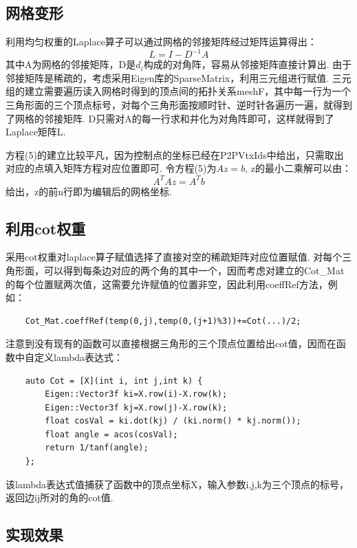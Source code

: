 \documentclass[12pt]{article}
\begin{document}
\subsection{网格变形}
利用均匀权重的Laplace算子可以通过网格的邻接矩阵经过矩阵运算得出：
\begin{equation}
    L=I-D^{-1}A
\end{equation}
其中A为网格的邻接矩阵，D是$d_i$构成的对角阵，容易从邻接矩阵直接计算出. 由于邻接矩阵是稀疏的，考虑采用Eigen库的SparseMatrix，利用三元组进行赋值. 
三元组的建立需要遍历读入网格时得到的顶点间的拓扑关系meshF，其中每一行为一个三角形面的三个顶点标号，对每个三角形面按顺时针、逆时针各遍历一遍，就得到了网格的邻接矩阵. 
D只需对A的每一行求和并化为对角阵即可，这样就得到了Laplace矩阵L.

方程(5)的建立比较平凡，因为控制点的坐标已经在P2PVtxIds中给出，只需取出对应的点填入矩阵方程对应位置即可. 令方程(5)为$Az=b$, z的最小二乘解可以由：
\begin{equation}
    A^T Az=A^T b
\end{equation}
给出，z的前n行即为编辑后的网格坐标. 

\subsection{利用cot权重}
采用cot权重对laplace算子赋值选择了直接对空的稀疏矩阵对应位置赋值. 对每个三角形面，可以得到每条边对应的两个角的其中一个，因而考虑对建立的Cot\_Mat的每个位置赋两次值，这需要允许赋值的位置非空，因此利用coeffRef方法，例如：
\begin{lstlisting}
    Cot_Mat.coeffRef(temp(0,j),temp(0,(j+1)%3))+=Cot(...)/2;
\end{lstlisting}

注意到没有现有的函数可以直接根据三角形的三个顶点位置给出cot值，因而在函数中自定义lambda表达式：
\begin{lstlisting}
    auto Cot = [X](int i, int j,int k) {
        Eigen::Vector3f ki=X.row(i)-X.row(k);
        Eigen::Vector3f kj=X.row(j)-X.row(k);
        float cosVal = ki.dot(kj) / (ki.norm() * kj.norm());
        float angle = acos(cosVal);
        return 1/tanf(angle);
    };
\end{lstlisting}
该lambda表达式值捕获了函数中的顶点坐标X，输入参数i,j,k为三个顶点的标号，返回边ij所对的角的cot值. 

\subsection{实现效果}
\end{document}
